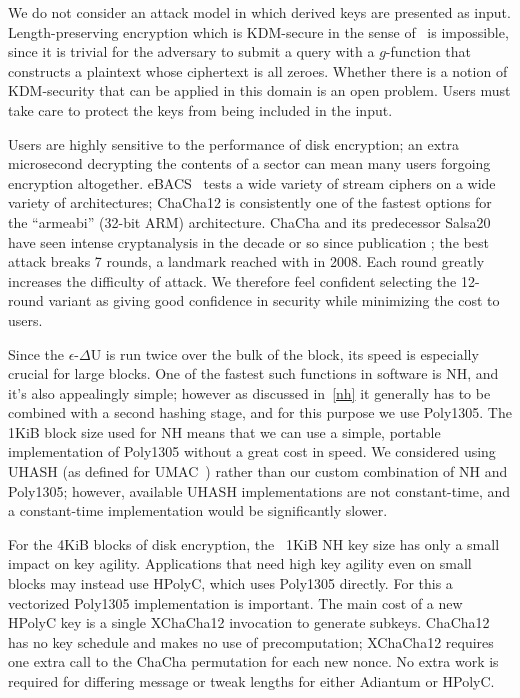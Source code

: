 \documentclass[eprint.tex]{subfiles}
\begin{document}
We do not consider an attack model in which derived keys are presented as input.
Length-preserving encryption
which is KDM-secure in the sense of~\cite{kdm} is impossible, since it is trivial for the
adversary to submit a query with a $g$-function
that constructs a plaintext whose ciphertext is all zeroes.
Whether there is a notion of KDM-security that can be
applied in this domain is an open problem. Users must take care to protect the keys from being
included in the input.

Users are highly sensitive to the performance of disk encryption; an
extra microsecond decrypting the contents of a sector can mean many users
forgoing encryption altogether.
eBACS~\cite{supercop} tests a wide variety of stream ciphers on a wide variety
of architectures; ChaCha12 is consistently one of the
fastest options for the ``armeabi'' (32-bit ARM) architecture.
ChaCha and its predecessor Salsa20
have seen intense cryptanalysis in the decade or so since publication
\cite{tdcs20,nonrandomsalsa,tsunoo,latindance,ishiguro2011,ishiguro2012,zhenqing2012,
maitra2015,chachamaitra,choudhuri2016,dey2017,Choudhuri_Maitra_2017,chacha2018};
the best attack breaks 7 rounds, a landmark reached with \cite{latindance} in 2008.
Each round greatly increases the difficulty of attack.
We therefore feel confident selecting the 12-round variant as giving
good confidence in security while minimizing the cost to users.

Since the $\epsilon$-$\Delta$U is run twice over the bulk of the block, its speed is especially
crucial for large blocks. One of the fastest such functions in software is NH, and
it's also appealingly simple; however as discussed in~\autoref{nh} it generally has to be
combined with a second hashing stage, and for this purpose we use Poly1305. The 1KiB block size
used for NH means that we can use a simple, portable implementation of Poly1305 without a great
cost in speed.  We considered using UHASH (as defined for UMAC~\cite{rfc4418}) rather than our
custom combination of NH and Poly1305; however, available UHASH implementations
are not constant-time, and a constant-time implementation would be significantly
slower.

For the 4KiB blocks of disk encryption,
the ~1KiB NH key size has only a small impact on key agility. Applications
that need high key agility even on small blocks may instead use HPolyC, which
uses Poly1305 directly. For this a vectorized Poly1305 implementation is important.  The main
cost of a new HPolyC key is a single XChaCha12 invocation to generate subkeys.
ChaCha12 has no key schedule
and makes no use of precomputation; XChaCha12
requires one extra call to the ChaCha permutation for each new nonce.
No extra work is required for differing message or tweak lengths for either Adiantum
or HPolyC.
\end{document}
